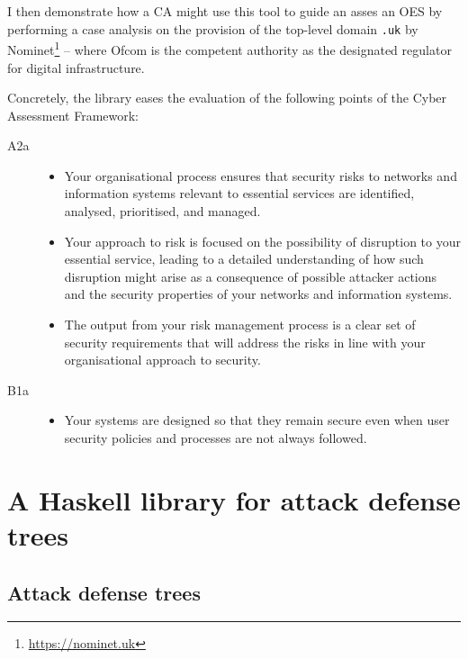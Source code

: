 \documentclass{scrreprt}
\begin{document}
I then demonstrate how a CA might use this tool to guide an asses an OES by
performing a case analysis on the provision of the top-level domain \texttt{.uk}
by Nominet\footnote{\url{https://nominet.uk}} -- where Ofcom is the competent
authority as the designated regulator for digital infrastructure.

Concretely, the library eases the evaluation of the following points of the
Cyber Assessment Framework:

\begin{description}
    \item [A2a]
        \begin{itemize}
            \item Your organisational process ensures that security risks to
                networks and information systems relevant to essential services
                are identified, analysed, prioritised, and managed.
            \item Your approach to risk is focused on the possibility of
                disruption to your essential service, leading to a detailed
                understanding of how such disruption might arise as a
                consequence of possible attacker actions and the security
                properties of your networks and information systems.
            \item The output from your risk management process is a clear set of
                security requirements that will address the risks in line with
                your organisational approach to security.
        \end{itemize}

    \item [B1a]
        \begin{itemize}
            \item Your systems are designed so that they remain secure even when
                user security policies and processes are not always followed.
        \end{itemize}
\end{description}

\chapter{A Haskell library for attack defense trees}

\section{Attack defense trees}
\end{document}
